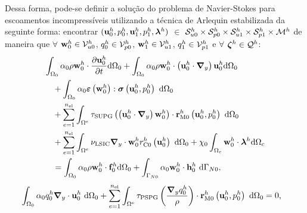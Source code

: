 Dessa forma, pode-se definir a solução do problema de Navier-Stokes para escoamentos incompressíveis utilizando a técnica de Arlequin estabilizada da seguinte forma: encontrar $(\mathbf{u}_0^h,p_0^h,\mathbf{u}_1^h,p_1^h,\boldsymbol{\lambda}^h)$ $\in$ $\mathcal{S}_{u0}^h \times \mathcal{S}_{p0}^h \times \mathcal{S}_{u1}^h \times \mathcal{S}_{p1}^h \times \mathcal{M}^h$ de maneira que  $\forall$ $\mathbf{w}_0^h \in \mathcal{V}_{u0}^h$, $q_0^h \in \mathcal{V}_{p0}^h$, $\mathbf{w}_1^h \in \mathcal{V}_{u1}^h$, $q_1^h \in \mathcal{V}_{p1}^h$ e $\forall$ $\boldsymbol{\zeta}^h \in \mathcal{Q}^h$:
\begin{align}
	\begin{split}
		&\int_{\globalModel} \arlequinWFGlobal \density \wglobalh \cdot \frac{\partial\uglobalh}{\partial t} \deriv \globalModel +
		\int_{\globalModel} \arlequinWFGlobal \density \wglobalh \cdot  \left(\uglobalh \cdot \gradient \right) \uglobalh \deriv \globalModel  \\ 
		&\quad+	
		\int_{\globalModel} \arlequinWFGlobal \straintensor \left(\wglobalh\right) : \stressTensor \left(\uglobalh,\pglobalh\right)\ \deriv \globalModel \\
		&\quad+ \sum_{e=1}^{\nel} \int_{\domainE} \SUPG  \left(\left(\uglobalh \cdot \gradient \right) \wglobalh\right) \cdot \resMomGlobal\left(\uglobalh,\pglobalh \right)\  \deriv \globalModel \\ 
		&\quad+\sum_{e=1}^{\nel} \int_{\domainE} \LSIC \divergence \cdot \wglobalh \resPreGlobal 
		\left(\uglobalh\right)\  \deriv \globalModel 
		+ \chi_{0} \int_{\gluingZone} \wglobalh \cdot \lagrangeMultiplierh \deriv \gluingZone   \\ 
		&\quad = \int_{\globalModel} \arlequinWFGlobal \density \wglobalh \cdot  \globalsbodyforceh \deriv \globalModel + \int_{\globalBoundaryN} \arlequinWFGlobal \wglobalh  \cdot \globalSurfaceLoadh\ \deriv \globalBoundaryN,
		\label{eq:QM_forma_fraca_0_atu}
	\end{split}
\end{align}
\begin{align}
	\begin{split}
		&	\int_{\Omega_0} \alpha_0 q_0^h \boldsymbol{\nabla}_y \cdot \mathbf{u}_0^h \ \mathrm{d} \Omega_0 +
		\sum_{e=1}^{n_{\mathrm{el}}} \int_{\Omega^e} \tau_{\mathrm{PSPG}} \left(\frac{\boldsymbol{\nabla}_y q_0^h}{\rho}\right) \cdot \mathbf{r}_{\mathrm{M0}}^{h}\left(\mathbf{u}_0^h,p_0^h\right) \  \mathrm{d} \Omega_0 = 0,
		\label{eq:C_forma_fraca_0_atu}
	\end{split}
\end{align}
